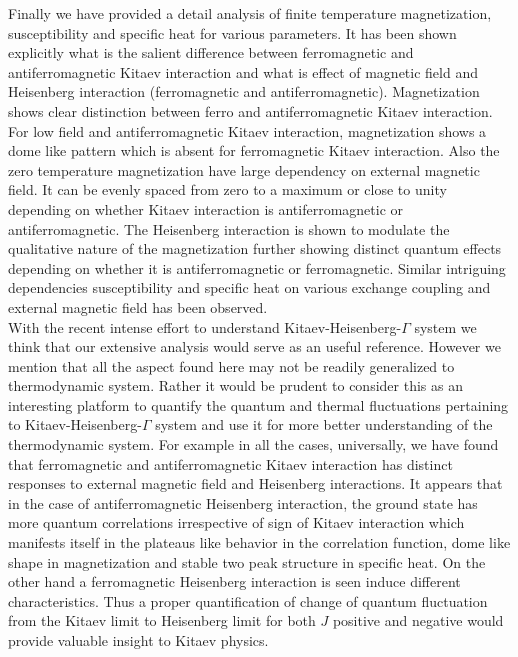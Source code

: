 \documentclass[aps,amsmath,twocolumn,amssymb,floatfix,showpacs,superscriptaddress,nofootinbib,longbibliography]{revtex4-1}
\begin{document}
\indent
Finally we have provided a detail analysis of finite temperature magnetization, susceptibility and specific heat for various parameters. It has been shown explicitly what is the salient difference between ferromagnetic  and antiferromagnetic Kitaev
interaction and what is effect of magnetic field and Heisenberg interaction (ferromagnetic and antiferromagnetic). Magnetization
shows clear distinction between ferro and antiferromagnetic Kitaev interaction. For low field and antiferromagnetic Kitaev interaction,
magnetization shows a dome like pattern which is absent for ferromagnetic Kitaev interaction. Also the zero temperature magnetization
have large dependency on external magnetic field. It can be evenly spaced from zero to a maximum or close to unity depending on whether Kitaev interaction is antiferromagnetic or antiferromagnetic. The Heisenberg interaction is shown to modulate the qualitative nature
of the magnetization further showing distinct quantum effects depending on whether it is antiferromagnetic or ferromagnetic. Similar
intriguing dependencies susceptibility and specific heat on various exchange coupling and external magnetic field has been observed. \\
\indent
With the recent intense effort to understand Kitaev-Heisenberg-$\Gamma$ system we think that our extensive analysis would serve as 
an useful reference. However we mention that all the aspect found here may not be readily generalized to thermodynamic system. Rather
it would be prudent to consider this as an interesting platform to quantify the quantum and thermal fluctuations pertaining to Kitaev-Heisenberg-$\Gamma$ system and use it for more better understanding of the thermodynamic system. For example in all the cases, universally, we have found that ferromagnetic and antiferromagnetic Kitaev interaction has distinct responses to external magnetic field
and Heisenberg interactions. It appears that in the case of antiferromagnetic Heisenberg interaction, the ground state has more quantum correlations irrespective of sign of Kitaev interaction which manifests itself in the plateaus like behavior in the correlation function, dome like shape in magnetization and stable two peak structure in specific heat. On the other hand a ferromagnetic Heisenberg
interaction is seen induce different characteristics. Thus a proper quantification of change of quantum fluctuation from the Kitaev limit to Heisenberg limit for both $J$ positive and negative would provide valuable insight to Kitaev physics. \\
\indent
\end{document}
